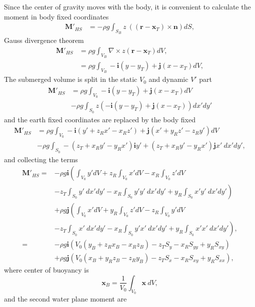 \documentclass[]{book}
\newcommand{\V}[1]{\boldsymbol{#1}}
\newcommand{\nn}{\nonumber}
\begin{document}
Since the center of gravity moves with the body, it is convenient to calculate the moment in body fixed coordinates
\begin{align}
\V{M}'_{HS} &=- \rho g \int_{S_B} z ~ ((\V{r}-\V{x}_T) \times \V{n}) dS,
\end{align}
Gauss divergence theorem
\begin{align}
\V{M}'_{HS} &= \rho g \int_{V_B} \nabla  \times z (\V{r}-\V{x}_T) dV, \\
&= \rho g \int_{V_B} -\V{i} (y-y_T) + \V{j}(x-x_T) dV,
\end{align}
The submerged volume is split in the static $V_0$ and dynamic $V'$ part
\begin{align}
\V{M}'_{HS} &= \rho g \int_{V_0} -\V{i} (y-y_T) + \V{j}(x-x_T) dV 
\nonumber \\ &- \rho g \int_{S_0} z(-\V{i} (y-y_T) + \V{j}(x-x_T)) dx'dy' 
\end{align}
and the earth fixed coordinates are replaced by the body fixed
\begin{align}
\V{M}'_{HS} &= \rho g \int_{V_0} -\V{i} (y' + z_Rx' - x_Rz') + \V{j}(x'+y_Rz' - z_Ry') dV \nonumber \\ 
&-\rho g \int_{S_0} - (z_T + x_R y' - y_R x') \V{i} y' + (z_T + x_R y' - y_R x') \V{j}x'~ dx'dy',
\end{align}
and collecting the terms 
\begin{align}
\V{M}'_{HS} =& 
-\rho g\V{i}\left(    
	\int_{V_0}  y'  dV
+  z_R\int_{V_0} x' dV 
-  x_R\int_{V_0} z' dV \right. \nn \\
&- \left. z_T\int_{S_0} y' ~ dx'dy'
-  x_R\int_{S_0} y'  y' ~ dx'dy' 
+  y_R\int_{S_0} x'  y' ~ dx'dy' \right)\nonumber \\ 
& + \rho g \V{j} \left(  
	\int_{V_0}  x' dV 
+ y_R\int_{V_0}  z' dV
- z_R\int_{V_0}  y' dV \right. \nn \\
& \left. - z_T\int_{S_0}  x' ~ dx'dy'
- x_R\int_{S_0}  y'  x' ~ dx'dy'
+ y_R\int_{S_0}  x'  x' ~ dx'dy' \right), \\
 =& 
-\rho g\V{i}\left(    
	V_0 (y_B
+  z_R x_B
-  x_R z_B )
-  z_T S_y
-  x_R S_{yy}
+  y_R S_{xy} \right) \nonumber \\ 
& + \rho g \V{j} \left(  
	V_0 (x_B
+ y_R  z_B
- z_R  y_B)
- z_T S_x
- x_R S_{xy}
+ y_R S_{xx} \right),
\end{align}
where center of buoyancy is 
\begin{equation}
	\V{x}_{B} = \frac{1}{V_0} \int_{V_0} \V{x} ~dV, 
\end{equation}
and the second water plane moment are
\end{document}
